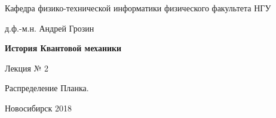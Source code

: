 \documentclass[12pt,pagesize,paper=landscape,paper=192mm:108mm]{scrbook}
\begin{document}
\begin{titlepage}
\begin{center}
    Кафедра физико-технической информатики физического факультета НГУ
    \medskip

    \Large
    д.ф.-м.н. Андрей Грозин
    
    \bigskip

    \huge
    \textbf{История Квантовой механики}
    \bigskip

    \Large
    Лекция № 2
    \vfill

    \normalsize
    \begin{minipage}{0.65\linewidth}
\centering      Распределение Планка.
    \end{minipage}
    \vfill

    \normalsize \ccbysa\hspace{0.5em}  Новосибирск 2018
  \end{center}
\end{titlepage}
\end{document}
